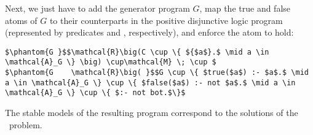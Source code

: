 %
Next, we just have to add the generator program $G$, 
map the true and false atoms of $G$ to their counterparts in the positive disjunctive logic program 
(represented by predicates  and , respectively),
and enforce the atom  to hold:
\begin{lstlisting}[mathescape=true]
$\phantom{G }$$\mathcal{R}\big(C \cup \{ ${$a$}.$ \mid a \in \mathcal{A}_G \} \big) \cup\mathcal{M} \; \cup $
$\phantom{G    \mathcal{R}\big( }$$G \cup \{ $true($a$) :- $a$.$ \mid a \in \mathcal{A}_G \} \cup \{ $false($a$) :- not $a$.$ \mid a \in \mathcal{A}_G \} \cup \{ $:- not bot.$\}$
\end{lstlisting}
%
The stable models of the resulting program correspond to the solutions of the \gc\ problem.


